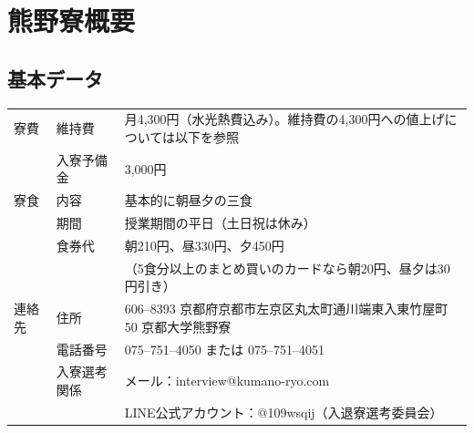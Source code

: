 \section{熊野寮概要} \label{sec:abst}

		\subsection{基本データ} \label{subsec:data}
		\begin{table}[htbp]
      \begin{tabular}{|l|l|l|}
      \hline
      寮費\index{りょうひ@寮費|seealsopage{維持費}}  & 維持費\index{いじひ@維持費|seealsopage{寮費}}    & 月4,300円（水光熱費込み）。維持費の4,300円への値上げについては以下を参照                    \\
          & 入寮予備金  & 3,000円                                                       \\ \hline
      寮食\index{りょうしょく@寮食}  & 内容     & 基本的に朝昼夕の三食                                                   \\
          & 期間     & 授業期間の平日（土日祝は休み）                \\
          & 食券代\index{りょうしょく@寮食!のねだん@---の値段}    & 朝210円、昼330円、夕450円 \\
         　&　& （5食分以上のまとめ買いのカードなら朝20円、昼夕は30円引き）         \\ \hline
      連絡先\index{くまのりょう@熊野寮!のれんらくさき@---の連絡先}
       & 住所\index{くまのりょう@熊野寮!のじゅうしょ@---の住所}   & 606--8393 京都府京都市左京区丸太町通川端東入東竹屋町50 京都大学熊野寮                     \\
          & 電話番号   & 075--751--4050 または 075--751--4051                                \\
          & 入寮選考関係\index{にゅうりょう@入寮!にかんするといあわせ@---に関する問い合わせ} & メール：interview@kumano-ryo.com \\
          　&　& LINE公式アカウント：@109wsqij（入退寮選考委員会） \\ \hline
      \end{tabular}
      \end{table}
